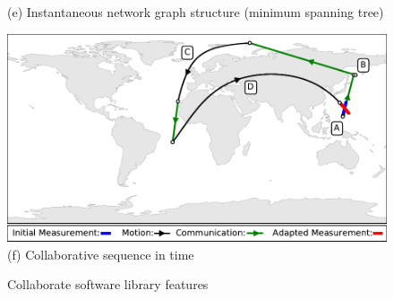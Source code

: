 \documentclass[conference]{IEEEtran}
\begin{document}
\begin{figure}[b!]
\begin{minipage}[b]{\linewidth}
\begin{center}
      {\footnotesize(e) Instantaneous network graph structure (minimum spanning
        tree)}
    \end{center}
    \medskip
  \end{minipage}
  \begin{minipage}[b]{\linewidth}
    \begin{center}
      \includegraphics[width=\textwidth]{images/collaborate.pdf}
      {\footnotesize(f) Collaborative sequence in time}
    \end{center}
  \end{minipage}
  \caption{Collaborate software library features}
  \label{fig:features}
\end{figure}
\end{document}
